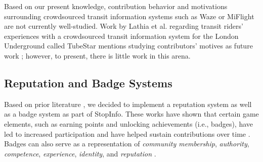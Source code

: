 Based on our present knowledge, contribution behavior and motivations surrounding crowdsourced transit information systems such as Waze or MiFlight are not currently well-studied. Work by Lathia et al. regarding transit riders' experiences with a crowdsourced transit information system for the London Underground called TubeStar mentions studying contributors' motives as future work \cite{lathia-2014}; however, to present, there is little work in this arena. 

\subsection{Reputation and Badge Systems}

Based on prior literature \cite{antin-2011, depaoli-2012, mamykina-2011}, we decided to implement a reputation system as well as a badge system as part of StopInfo. These works have shown that certain game elements, such as earning points and unlocking achievements (i.e., badges), have led to increased participation and have helped sustain contributions over time \cite{iacovides-2013}. Badges can also serve as a representation of \emph{community membership}, \emph{authority}, \emph{competence}, \emph{experience}, \emph{identity}, and \emph{reputation} \cite{halavais-2012}.
